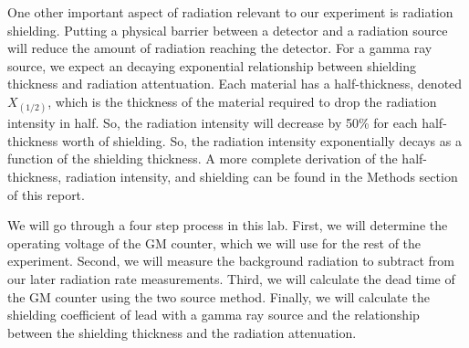 \par One other important aspect of radiation relevant to our experiment is radiation shielding. Putting a physical barrier between a detector and a radiation source will reduce the amount of radiation reaching the detector. For a gamma ray source, we expect an decaying exponential relationship between shielding thickness and radiation attentuation. Each material has a half-thickness, denoted $X_(1/2)$, which is the thickness of the material required to drop the radiation intensity in half. So, the radiation intensity will decrease by 50\% for each half-thickness worth of shielding. So, the radiation intensity exponentially decays as a function of the shielding thickness. \cite{Student Manual}A more complete derivation of the half-thickness, radiation intensity, and shielding can be found in the Methods section of this report.

\par We will go through a four step process in this lab. First, we will determine the operating voltage of the GM counter, which we will use for the rest of the experiment. Second, we will measure the background radiation to subtract from our later radiation rate measurements. Third, we will calculate the dead time of the GM counter using the two source method. Finally, we will calculate the shielding coefficient of lead with a gamma ray source and the relationship between the shielding thickness and the radiation attenuation.

\begin{comment}
\par We expect the radiation attenuation to follow an exponential decay as a function of lead shielding thickness. The intensity (I) after passing through a lead shield of thickness X is given by the equation
\begin{equation}
I = I_0e^{-\mu X},
\end{equation}
where $I_0$ is the initial intensity and $\mu$ is the attenuation coefficient. To solve this equation for $\mu$, we set the final intensity equal to half the initial intensity, which will occur after a thickness $X_{1/2}$, the half thickness:
\begin{equation}
1/2 I = I_0e^{-\mu X_{1/2}}.
\end{equation}
Solving Equation (2) for $\mu$ gives
\begin{equation}
\mu = ln(2)/{X_{1/2}}.
\end{equation}
We will measure and calculate $\mu$ and $X_{1/2}$ for Cobalt-60 gamma radiation attenuation through lead, expecting an exponential relationship between the shielding thickness and the radiation attenuation\cite{Spectrum}. 
\end{comment}
